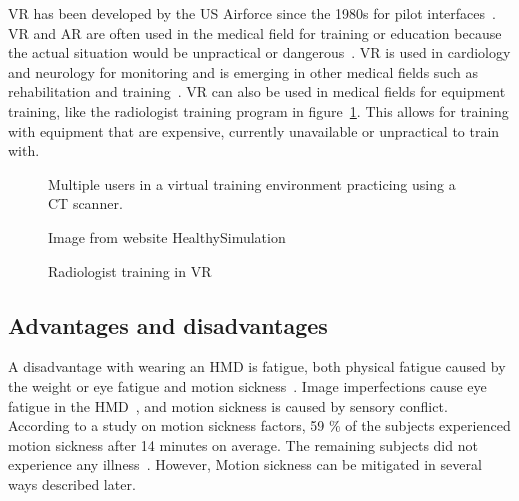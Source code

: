 \documentclass[a4paper]{report}
\begin{document}
VR has been developed by the US Airforce since the 1980s for pilot interfaces~\cite{mertz_virtual_2019}. VR and AR are often used in the medical field for training or education because the actual situation would be unpractical or dangerous~\cite{freina_immersive_2015}.
VR is used in cardiology and neurology for monitoring and is emerging in other medical fields such as rehabilitation and training~\cite{javaid_virtual_2020}.
VR can also be used in medical fields for equipment training, like the radiologist training program in figure~\ref{training}. This allows for training with equipment that are expensive, currently unavailable or unpractical to train with.

\begin{figure}[h!]
    \centering
	\hfill
  \caption{Radiologist training in VR}
  \label{training}
  \small
Multiple users in a virtual training environment practicing using a CT scanner.

Image from website HealthySimulation~\cite{noauthor_how_2020}
\end{figure}


\subsection{Advantages and disadvantages}
A disadvantage with wearing an HMD is fatigue, both physical fatigue caused by the weight or eye fatigue and motion sickness~\cite{merhi_motion_2007}.
Image imperfections cause eye fatigue in the HMD~\cite{kooi_visual_2004}, and motion sickness is caused by sensory conflict.
According to a study on motion sickness factors, 59 \% of the subjects experienced motion sickness after 14 minutes on average. The remaining subjects did not experience any illness~\cite{kooi_visual_2004}. However, Motion sickness can be mitigated in several ways described later.
\end{document}
